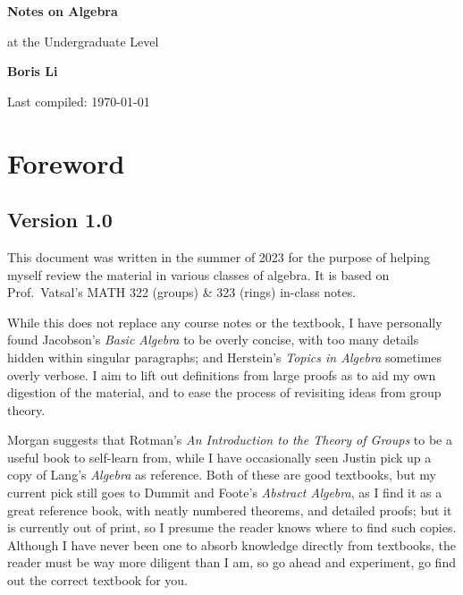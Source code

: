 \begin{titlepage}
\begin{center}
    \vspace*{1cm}
    {\Huge\textbf{Notes on Algebra}}

    \vspace{5mm}
    {\LARGE at the Undergraduate Level}

    \vspace{15mm}
    {\Large\textbf{Boris Li}}

    \vspace*{4cm}

    \vfill

    {\large Last compiled: \today}
\end{center}
\end{titlepage}

\section*{Foreword}

\subsection*{Version 1.0} 

This document was written in the summer of 2023
for the purpose of helping myself review the material
in various classes of algebra.
It is based on Prof.\ Vatsal's MATH 322 (groups) \& 323 (rings) in-class notes.

While this does not replace any course notes or the textbook,
I have personally found Jacobson's \textit{Basic Algebra}
to be overly concise,
with too many details hidden within singular paragraphs;
and Herstein's \textit{Topics in Algebra} sometimes overly verbose.
I aim to lift out definitions from large proofs
as to aid my own digestion of the material,
and to ease the process of revisiting ideas from group theory.

Morgan suggests that Rotman's \textit{An Introduction to the Theory of Groups}
to be a useful book to self-learn from,
while I have occasionally seen Justin
pick up a copy of Lang's \textit{Algebra} as reference.
Both of these are good textbooks,
but my current pick still goes to Dummit and Foote's \textit{Abstract Algebra},
as I find it as a great reference book,
with neatly numbered theorems, and detailed proofs;
but it is currently out of print,
so I presume the reader knows where to find such copies.
Although I have never been one to absorb knowledge directly from textbooks,
the reader must be way more diligent than I am,
so go ahead and experiment,
go find out the correct textbook for you.

